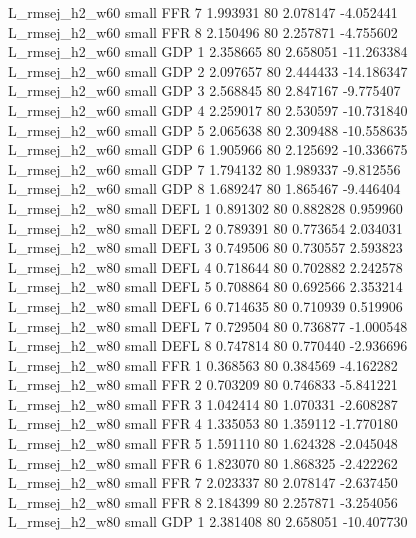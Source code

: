 L_rmsej_h2_w60      small      FFR                 7 1.993931 80       2.078147          -4.052441
L_rmsej_h2_w60      small      FFR                 8 2.150496 80       2.257871          -4.755602
L_rmsej_h2_w60      small      GDP                 1 2.358665 80       2.658051         -11.263384
L_rmsej_h2_w60      small      GDP                 2 2.097657 80       2.444433         -14.186347
L_rmsej_h2_w60      small      GDP                 3 2.568845 80       2.847167          -9.775407
L_rmsej_h2_w60      small      GDP                 4 2.259017 80       2.530597         -10.731840
L_rmsej_h2_w60      small      GDP                 5 2.065638 80       2.309488         -10.558635
L_rmsej_h2_w60      small      GDP                 6 1.905966 80       2.125692         -10.336675
L_rmsej_h2_w60      small      GDP                 7 1.794132 80       1.989337          -9.812556
L_rmsej_h2_w60      small      GDP                 8 1.689247 80       1.865467          -9.446404
L_rmsej_h2_w80      small     DEFL                 1 0.891302 80       0.882828           0.959960
L_rmsej_h2_w80      small     DEFL                 2 0.789391 80       0.773654           2.034031
L_rmsej_h2_w80      small     DEFL                 3 0.749506 80       0.730557           2.593823
L_rmsej_h2_w80      small     DEFL                 4 0.718644 80       0.702882           2.242578
L_rmsej_h2_w80      small     DEFL                 5 0.708864 80       0.692566           2.353214
L_rmsej_h2_w80      small     DEFL                 6 0.714635 80       0.710939           0.519906
L_rmsej_h2_w80      small     DEFL                 7 0.729504 80       0.736877          -1.000548
L_rmsej_h2_w80      small     DEFL                 8 0.747814 80       0.770440          -2.936696
L_rmsej_h2_w80      small      FFR                 1 0.368563 80       0.384569          -4.162282
L_rmsej_h2_w80      small      FFR                 2 0.703209 80       0.746833          -5.841221
L_rmsej_h2_w80      small      FFR                 3 1.042414 80       1.070331          -2.608287
L_rmsej_h2_w80      small      FFR                 4 1.335053 80       1.359112          -1.770180
L_rmsej_h2_w80      small      FFR                 5 1.591110 80       1.624328          -2.045048
L_rmsej_h2_w80      small      FFR                 6 1.823070 80       1.868325          -2.422262
L_rmsej_h2_w80      small      FFR                 7 2.023337 80       2.078147          -2.637450
L_rmsej_h2_w80      small      FFR                 8 2.184399 80       2.257871          -3.254056
L_rmsej_h2_w80      small      GDP                 1 2.381408 80       2.658051         -10.407730
